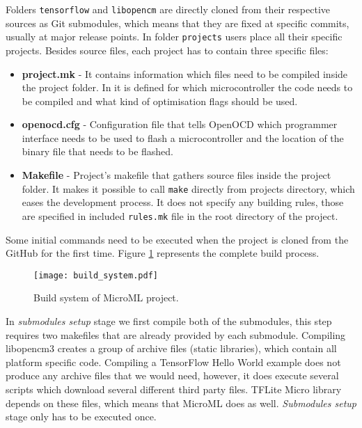 Folders \verb|tensorflow| and \verb|libopencm| are directly cloned from their respective sources as Git submodules, which means that they are fixed at specific commits, usually at major release points.
In folder \verb|projects| users place all their specific projects.
Besides source files, each project has to contain three specific files:

\begin{itemize}
    \item \textbf{project.mk} - It contains information which files need to be compiled inside the project folder. In it is defined for which microcontroller the code needs to be compiled and what kind of optimisation flags should be used.
    \item \textbf{openocd.cfg} - Configuration file that tells OpenOCD which programmer interface needs to be used to flash a microcontroller and the location of the binary file that needs to be flashed.
    \item \textbf{Makefile} - Project's makefile that gathers source files inside the project folder. It makes it possible to call \verb|make| directly from projects directory, which eases the development process. It does not specify any building rules, those are specified in included \verb|rules.mk| file in the root directory of the project.
\end{itemize}

Some initial commands need to be executed when the project is cloned from the GitHub for the first time. 
Figure \ref{build_system} represents the complete build process.

\begin{figure}[ht]
        \centering
        \texttt{[image: build\_system.pdf]} 
        \caption{ Build system of MicroML project.} 
        \label{build_system}
\end{figure}

In \textit{submodules setup} stage we first compile both of the submodules, this step requires two makefiles that are already provided by each submodule.
Compiling libopencm3 creates a group of archive files (static libraries), which contain all platform specific code.
Compiling a TensorFlow Hello World example does not produce any archive files that we would need, however, it does execute several scripts which download several different third party files.
TFLite Micro library depends on these files, which means that MicroML does as well.
\textit{Submodules setup} stage only has to be executed once.

